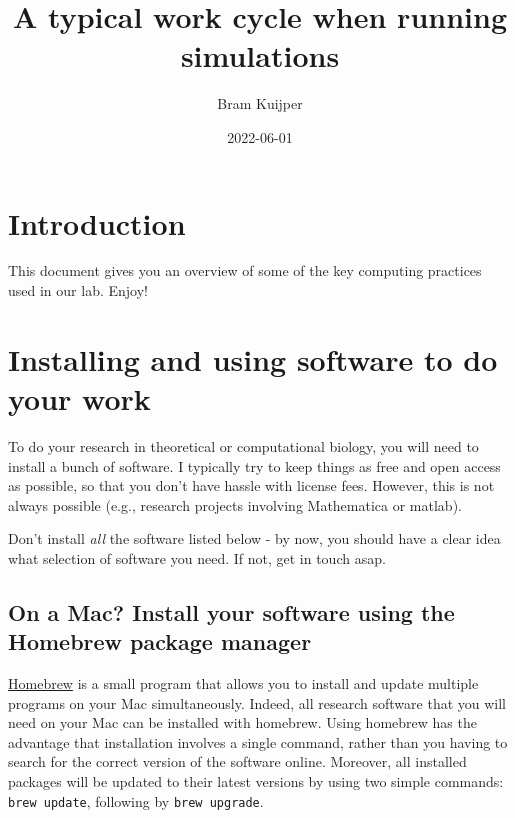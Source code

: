 \documentclass[
]{book}
\title{A typical work cycle when running simulations}
\author{Bram Kuijper}
\date{2022-06-01}
\begin{document}
\maketitle

{
\setcounter{tocdepth}{1}
\tableofcontents
}
\hypertarget{introduction}{%
\chapter{Introduction}\label{introduction}}

This document gives you an overview of some of the key computing practices used in our lab. Enjoy!

\hypertarget{installing-and-using-software-to-do-your-work}{%
\chapter{Installing and using software to do your work}\label{installing-and-using-software-to-do-your-work}}

To do your research in theoretical or computational biology, you will need to install a bunch of software. I typically try to keep things as free and open access as possible, so that you don't have hassle with license fees. However, this is not always possible (e.g., research projects involving Mathematica or matlab).

Don't install \emph{all} the software listed below - by now, you should have a clear idea what selection of software you need. If not, get in touch asap.

\hypertarget{on-a-mac-install-your-software-using-the-homebrew-package-manager}{%
\section{On a Mac? Install your software using the Homebrew package manager}\label{on-a-mac-install-your-software-using-the-homebrew-package-manager}}

\href{https://brew.sh}{Homebrew} is a small program that allows you to install and update multiple programs on your Mac simultaneously. Indeed, all research software that you will need on your Mac can be installed with homebrew. Using homebrew has the advantage that installation involves a single command, rather than you having to search for the correct version of the software online. Moreover, all installed packages will be updated to their latest versions by using two simple commands: \texttt{brew\ update}, following by \texttt{brew\ upgrade}.
\end{document}
